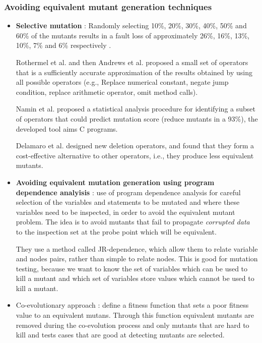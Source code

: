 \subsubsection{Avoiding equivalent mutant generation techniques}

\begin{itemize}
	\item \textbf{Selective mutation} \cite{mresa1999efficiency}:
	Randomly selecting 10\%, 20\%, 30\%, 40\%, 50\% and 60\% of the mutants results in a fault loss of approximately 26\%, 16\%, 13\%, 10\%, 7\% and 6\% respectively \cite{papadakis2010empirical}.

	Rothermel et al. \cite{rothermel1996experimental} and then Andrews et al. \cite{andrews2005mutation} proposed a small set of operators that is a sufficiently accurate approximation of the results obtained by using all possible operators (e.g., Replace numerical constant, negate jump condition, replace arithmetic operator, omit method calls).

	Namin et al. \cite{siami2008sufficient} proposed a statistical analysis procedure for identifying a subset of operators that could predict mutation score (reduce mutants in a 93\%), the developed tool aims C programs.

	Delamaro et al. \cite{delamaro2014designing} designed new deletion operators, and found that they form a cost-effective alternative to other operators, i.e., they produce less equivalent mutants.

	\item \textbf{Avoiding equivalent mutation generation using program dependence analyisis} \cite{harman2001relationship}: use of program dependence analysis for careful selection of the variables and statements to be mutated and where these variables need to be inspected, in order to avoid the equivalent mutant problem. The idea is to avoid mutants that fail to propagate \textit{corrupted data} to the inspection set at the probe point which will be equivalent.

	They use a method called JR-dependence, which allow them to relate variable and nodes pairs, rather than simple to relate nodes. This is good for mutation testing, because we want to know the set of variables which can be used to kill a mutant and which set of variables store values which cannot be used to kill a mutant.

	\item Co-evolutionary approach \cite{adamopoulos2004overcome}: define a fitness function that sets a poor fitness value to an equivalent mutans. Through this function equivalent mutants are removed during the co-evolution process and only mutants that are hard to kill and tests cases that are good at detecting mutants are selected.


\end{itemize}

